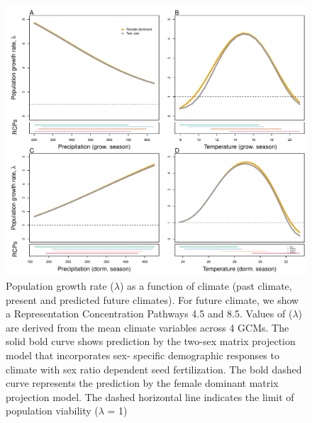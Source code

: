 \documentclass[12pt]{article}
\begin{document}
\begin{figure}[H]
  \begin{center}
    \includegraphics[width=0.95\linewidth]{Figures/lambda_past_present_future.pdf}
  \caption{Population growth rate ($\lambda$) as a function of climate (past climate, present and predicted future climates). For future climate, we show a Representation Concentration Pathways 4.5 and 8.5. Values of ($\lambda$) are derived from the mean climate variables across 4 GCMs. The solid bold curve shows prediction by the two-sex matrix projection model that incorporates sex- specific demographic responses to climate with sex ratio dependent seed fertilization. The bold dashed curve represents the prediction by the female dominant matrix projection model. The dashed horizontal line indicates the limit of population viability ($\lambda$ = 1)}
  \label{fig:lambda}
  \end{center}
\end{figure}
\end{document}
